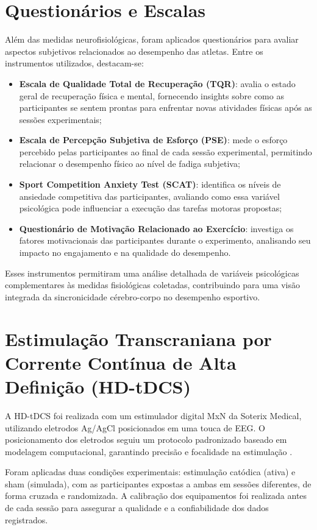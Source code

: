 \section{Questionários e Escalas}
Além das medidas neurofisiológicas, foram aplicados questionários para avaliar aspectos subjetivos relacionados ao desempenho das atletas. Entre os instrumentos utilizados, destacam-se:
\begin{itemize}
    \item \textbf{Escala de Qualidade Total de Recuperação (TQR)}: avalia o estado geral de recuperação física e mental, fornecendo insights sobre como as participantes se sentem prontas para enfrentar novas atividades físicas após as sessões experimentais;
    \item \textbf{Escala de Percepção Subjetiva de Esforço (PSE)}: mede o esforço percebido pelas participantes ao final de cada sessão experimental, permitindo relacionar o desempenho físico ao nível de fadiga subjetiva;
    \item \textbf{Sport Competition Anxiety Test (SCAT)}: identifica os níveis de ansiedade competitiva das participantes, avaliando como essa variável psicológica pode influenciar a execução das tarefas motoras propostas;
    \item \textbf{Questionário de Motivação Relacionado ao Exercício}: investiga os fatores motivacionais das participantes durante o experimento, analisando seu impacto no engajamento e na qualidade do desempenho.
\end{itemize}
Esses instrumentos permitiram uma análise detalhada de variáveis psicológicas complementares às medidas fisiológicas coletadas, contribuindo para uma visão integrada da sincronicidade cérebro-corpo no desempenho esportivo.


\section{Estimulação Transcraniana por Corrente Contínua de Alta Definição (HD-tDCS)}

A HD-tDCS foi realizada com um estimulador digital MxN da Soterix Medical, utilizando eletrodos Ag/AgCl posicionados em uma touca de EEG. O posicionamento dos eletrodos seguiu um protocolo padronizado baseado em modelagem computacional, garantindo precisão e focalidade na estimulação \cite{datta2008}. 

Foram aplicadas duas condições experimentais: estimulação catódica (ativa) e sham (simulada), com as participantes expostas a ambas em sessões diferentes, de forma cruzada e randomizada. A calibração dos equipamentos foi realizada antes de cada sessão para assegurar a qualidade e a confiabilidade dos dados registrados.

